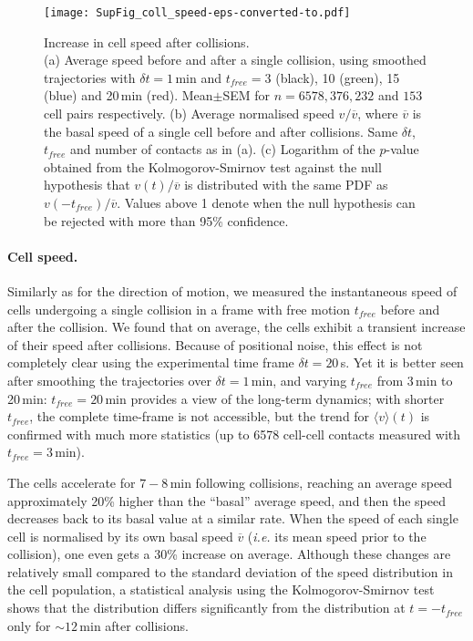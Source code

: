 \documentclass[11pt, twocolumn]{article}
\begin{document}
\begin{figure*}[ht!]
\centering
\texttt{[image: SupFig\_coll\_speed-eps-converted-to.pdf]}

\caption{Increase in cell speed after collisions.\\
  (a) Average speed before and after a single collision, using
  smoothed trajectories with $\delta t=1\,$min and $t_{free}=3$
  (black), 10 (green), 15 (blue) and 20\,min (red). Mean$\pm$SEM for
  $n=6578, 376, 232$ and $153$ cell pairs respectively.  (b) Average
  normalised speed $v/\overline{v}$, where $\overline{v}$ is the basal
  speed of a single cell before and after collisions. Same
  $\delta t$, $t_{free}$ and number of contacts as in (a).  (c)
  Logarithm of the $p$-value obtained from the Kolmogorov-Smirnov test
  against the null hypothesis that $v(t)/\overline{v}$ is distributed
  with the same PDF as $v(-t_{free})/\overline{v}$. Values above 1
  denote when the null hypothesis can be rejected with more than 95\%
  confidence.}
\label{fig:sup_coll_speed}
\end{figure*}

\paragraph{Cell speed.}
Similarly as for the direction of motion, we measured the
instantaneous speed of cells undergoing a single collision in a frame
with free motion $t_{free}$ before and after the collision.  We found
that on average, the cells exhibit a transient increase of their speed
after collisions. Because of positional noise, this effect is not
completely clear using the experimental time frame $\delta t=20\,$s.
Yet it is better seen after smoothing the trajectories over
$\delta t=1\,$min, and varying $t_{free}$ from 3\,min to 20\,min:
$t_{free}=20\,$min provides a view of the long-term dynamics; with
shorter $t_{free}$, the complete time-frame is not accessible, but the
trend for $\langle v\rangle(t)$ is confirmed with much more statistics
(up to 6578 cell-cell contacts measured with $t_{free}=3\,$min).

The cells accelerate for $7-8\,$min following collisions, reaching an
average speed approximately 20\% higher than the ``basal'' average
speed, and then the speed decreases back to its basal value at a
similar rate.  When the speed of each single cell is normalised by its
own basal speed $\overline{v}$ (\textit{i.e.} its mean speed prior to
the collision), one even gets a 30\% increase on average. Although
these changes are relatively small compared to the standard deviation
of the speed distribution in the cell population, a statistical
analysis using the Kolmogorov-Smirnov test shows that the distribution
differs significantly from the distribution at $t=-t_{free}$ only for
$\sim12\,$min after collisions.
\end{document}
